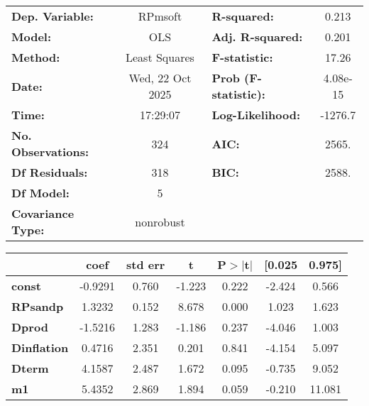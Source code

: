 \begin{center}
\begin{tabular}{lclc}
\toprule
\textbf{Dep. Variable:}    &     RPmsoft      & \textbf{  R-squared:         } &     0.213   \\
\textbf{Model:}            &       OLS        & \textbf{  Adj. R-squared:    } &     0.201   \\
\textbf{Method:}           &  Least Squares   & \textbf{  F-statistic:       } &     17.26   \\
\textbf{Date:}             & Wed, 22 Oct 2025 & \textbf{  Prob (F-statistic):} &  4.08e-15   \\
\textbf{Time:}             &     17:29:07     & \textbf{  Log-Likelihood:    } &   -1276.7   \\
\textbf{No. Observations:} &         324      & \textbf{  AIC:               } &     2565.   \\
\textbf{Df Residuals:}     &         318      & \textbf{  BIC:               } &     2588.   \\
\textbf{Df Model:}         &           5      & \textbf{                     } &             \\
\textbf{Covariance Type:}  &    nonrobust     & \textbf{                     } &             \\
\bottomrule
\end{tabular}
\begin{tabular}{lcccccc}
                    & \textbf{coef} & \textbf{std err} & \textbf{t} & \textbf{P$> |$t$|$} & \textbf{[0.025} & \textbf{0.975]}  \\
\midrule
\textbf{const}      &      -0.9291  &        0.760     &    -1.223  &         0.222        &       -2.424    &        0.566     \\
\textbf{RPsandp}    &       1.3232  &        0.152     &     8.678  &         0.000        &        1.023    &        1.623     \\
\textbf{Dprod}      &      -1.5216  &        1.283     &    -1.186  &         0.237        &       -4.046    &        1.003     \\
\textbf{Dinflation} &       0.4716  &        2.351     &     0.201  &         0.841        &       -4.154    &        5.097     \\
\textbf{Dterm}      &       4.1587  &        2.487     &     1.672  &         0.095        &       -0.735    &        9.052     \\
\textbf{m1}         &       5.4352  &        2.869     &     1.894  &         0.059        &       -0.210    &       11.081     \\

\end{tabular}
\end{center}
